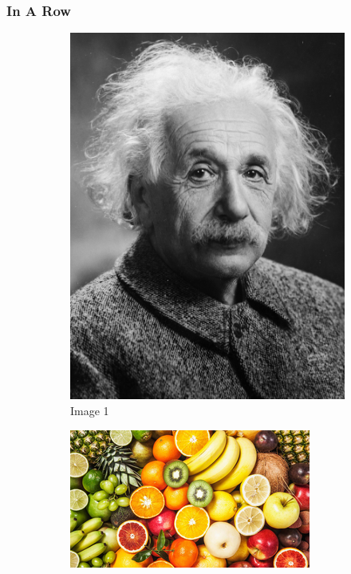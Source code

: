 \documentclass[twocolumn]{article}
\begin{document}
\subsubsection{In A Row}
\begin{figure}[htbp]
     \centering
     \begin{subfigure}{0.3\columnwidth}
         \centering
         \includegraphics[width=\columnwidth]{Images/Albert_Einstein.png}
         \caption{Image 1}
     \end{subfigure}
     \hfill
     \begin{subfigure}{0.3\columnwidth}
         \centering
         \includegraphics[width=\columnwidth]{Images/Fruits.png}

\end{subfigure}
\end{figure}
\end{document}
